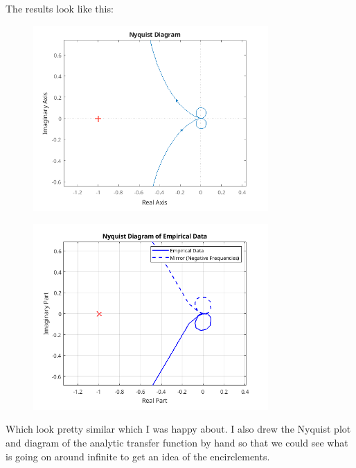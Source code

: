 \documentclass{article}
\begin{document}
The results look like this:

\begin{figure}[H]
    \centering
    \includegraphics[width=0.8\textwidth]{nyquistAnalytic.png}
    \label{fig:nyquistAnalytic}
\end{figure}

\begin{figure}[H]
    \centering
    \includegraphics[width=0.8\textwidth]{nyquistEmpirical.png}
    \label{fig:nyquistEmpirical}
\end{figure}

Which look pretty similar which I was happy about.
I also drew the Nyquist plot and diagram of the analytic transfer function by hand so that we could see what is going on around infinite to get an idea of the encirclements.
\end{document}
